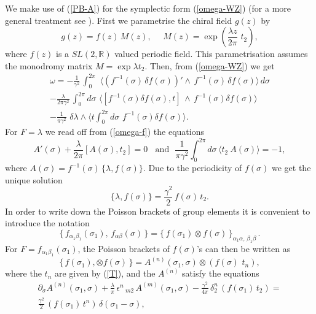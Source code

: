 \documentclass[a4paper,12pt]{article}
\newcommand{\rr}{\mathbb{R}}
\begin{document}
\noindent
We make use of (\ref{PB-A}) for the symplectic form (\ref{omega-WZ})
(for a more general treatment see \cite{BFP}). First we parametrise the chiral
field $g(z)$ by
\begin{equation}\label{g-f}
g(z)=f(z)\,M(z),~~~~~~
M(z)=\exp{\left(\frac{\lambda z}{2\pi}\,\,t_2\right)},
\end{equation}
where $f(z)$ is a $SL(2,\rr)$ valued periodic field.
This parametrisation assumes
 the monodromy matrix  $M=\exp{\lambda t_2}$. Then, from
(\ref{omega-WZ}) we get
\begin{eqnarray}\label{omega-f}
\omega =-\frac{1}{\gamma^2}\,
\int_0^{2\pi}\,\, \langle(f^{-1}(\sigma)\,\delta f(\sigma))'\wedge\,
f^{-1}(\sigma)\,\delta f(\sigma)\rangle\,d\sigma \nonumber \\
-\frac{\lambda}{2\pi\gamma^2}\,\int_0^{2\pi}d\sigma\,\,
\langle [f^{-1}(\sigma)\delta f(\sigma), t]\, \wedge\,
f^{-1}(\sigma)\delta f(\sigma)\rangle\nonumber \\
-\frac{1}{\pi\gamma^2}\,\,
\delta\lambda \wedge\langle t\int_0^{2\pi}d\sigma\,\,
f^{-1}(\sigma)\delta f(\sigma)\rangle.
\end{eqnarray}
 For $F=\lambda$ we read off from  (\ref{omega-f}) the equations
$$ A'(\sigma) +\frac{\lambda}{2\pi} [A(\sigma),t_2]=0~~~~
\mbox{and}~~~ \frac{1}{\pi\gamma^2}\int_0^{2\pi}d\sigma\,
\langle t_2~ A (\sigma)\rangle =-1,$$
where $A(\sigma) =
f^{-1}(\sigma)\,\{\lambda, f(\sigma)\}$. Due to the
 periodicity of $f(\sigma)$ we get the unique solution
\begin{equation}\label{PB-f-lambda}
\{\lambda ,f(\sigma)\} =\frac{\gamma^2}{2}\,f(\sigma)\,t_2.
\end{equation}
In order to write down the Poisson brackets of group elements
it is convenient to introduce the notation \cite{Goddard}
\begin{equation}\label{PB-fxf}
\{\,f_{\alpha_1\beta_1}(\sigma_1),\,f_{\alpha\beta}(\sigma)\,\}=
\{\,f(\sigma_1)\otimes f(\sigma)\,\}_{\alpha_1\alpha,\,\beta_1\beta}\,.
\end{equation}
For $F=f_{\alpha_1\beta_1}(\sigma_1)$,
the Poisson brackets of $f(\sigma)$'s can then be written as
\begin{equation}\label{PB-f-f}
\{\,f(\sigma_1),\otimes f(\sigma)\,\}=
A^{(n)}(\sigma_1,\sigma)\otimes
(f(\sigma)\,\,t_n),
\end{equation}
where the $t_n$ are given by (\ref{T}), and the
$A^{(n)}$ satisfy the equations
\begin{eqnarray}\label{eq-A^n}
\partial_\sigma A^{(n)}(\sigma_1,\sigma)+
\frac{\lambda}{\pi}\,\epsilon^n\,_{m2}\,
A^{(m)}(\sigma_1,\sigma) -
\frac{\gamma^2}{4\pi}\,\delta^n_2\, (f(\sigma_1)\,t_2)=
\nonumber \\
\frac{\gamma^2}{2}\, (f(\sigma_1)\,t^n)\,
\delta (\sigma_1-\sigma),
\end{eqnarray}
\end{document}
